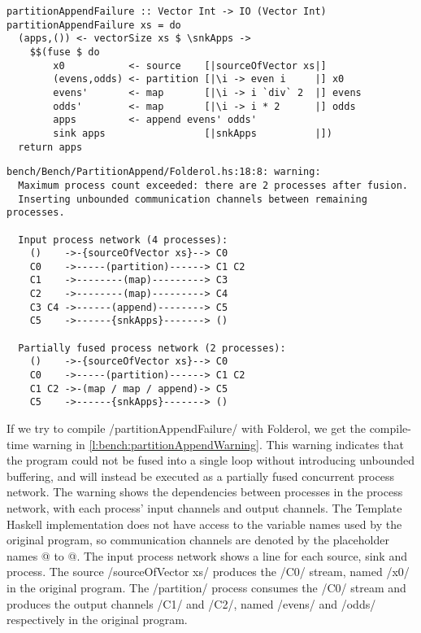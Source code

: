 \begin{lstlisting}[float,label=l:bench:partitionAppendFail,caption=Partition / append fusion failure]
partitionAppendFailure :: Vector Int -> IO (Vector Int)
partitionAppendFailure xs = do
  (apps,()) <- vectorSize xs $ \snkApps ->
    $$(fuse $ do
        x0           <- source    [|sourceOfVector xs|]
        (evens,odds) <- partition [|\i -> even i     |] x0
        evens'       <- map       [|\i -> i `div` 2  |] evens
        odds'        <- map       [|\i -> i * 2      |] odds
        apps         <- append evens' odds'
        sink apps                 [|snkApps          |])
  return apps
\end{lstlisting}


\begin{lstlisting}[float,language=nil,label=l:bench:partitionAppendWarning,caption=Partition / append fusion failure compile-time warning]
bench/Bench/PartitionAppend/Folderol.hs:18:8: warning:
  Maximum process count exceeded: there are 2 processes after fusion.
  Inserting unbounded communication channels between remaining processes.

  Input process network (4 processes):
    ()    ->-{sourceOfVector xs}--> C0
    C0    ->-----(partition)------> C1 C2
    C1    ->--------(map)---------> C3
    C2    ->--------(map)---------> C4
    C3 C4 ->------(append)--------> C5
    C5    ->------{snkApps}-------> ()
  
  Partially fused process network (2 processes):
    ()    ->-{sourceOfVector xs}--> C0
    C0    ->-----(partition)------> C1 C2
    C1 C2 ->-(map / map / append)-> C5
    C5    ->------{snkApps}-------> ()
\end{lstlisting}

If we try to compile \Hs/partitionAppendFailure/ with Folderol, we get the compile-time warning in \cref{l:bench:partitionAppendWarning}.
This warning indicates that the program could not be fused into a single loop without introducing unbounded buffering, and will instead be executed as a partially fused concurrent process network.
The warning shows the dependencies between processes in the process network, with each process' input channels and output channels.
The Template Haskell implementation does not have access to the variable names used by the original program, so communication channels are denoted by the placeholder names @ to @.
The input process network shows a line for each source, sink and process.
The source \Hs/{sourceOfVector xs}/ produces the \Hs/C0/ stream, named \Hs/x0/ in the original program.
The \Hs/partition/ process consumes the \Hs/C0/ stream and produces the output channels \Hs/C1/ and \Hs/C2/, named \Hs/evens/ and \Hs/odds/ respectively in the original program.

